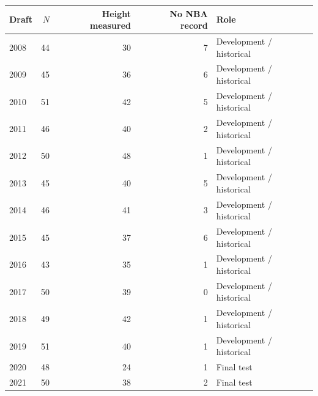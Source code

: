 \begin{tabular}{lrrrl}
\toprule
Draft & $N$ & Height measured & No NBA record & Role \\
\midrule
2008 & 44 & 30 & 7 & Development / historical \\
2009 & 45 & 36 & 6 & Development / historical \\
2010 & 51 & 42 & 5 & Development / historical \\
2011 & 46 & 40 & 2 & Development / historical \\
2012 & 50 & 48 & 1 & Development / historical \\
2013 & 45 & 40 & 5 & Development / historical \\
2014 & 46 & 41 & 3 & Development / historical \\
2015 & 45 & 37 & 6 & Development / historical \\
2016 & 43 & 35 & 1 & Development / historical \\
2017 & 50 & 39 & 0 & Development / historical \\
2018 & 49 & 42 & 1 & Development / historical \\
2019 & 51 & 40 & 1 & Development / historical \\
2020 & 48 & 24 & 1 & Final test \\
2021 & 50 & 38 & 2 & Final test \\
\bottomrule
\end{tabular}